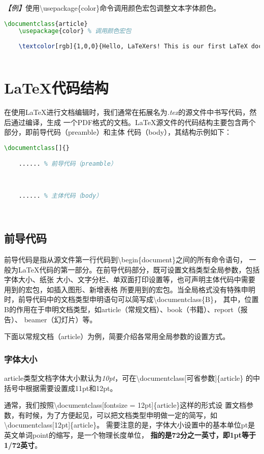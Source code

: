 \emph{【例】}使用\textbackslash usepackage\{color\}命令调用颜色宏包调整文本字体颜色。
\begin{lstlisting}[language=TeX]
    \documentclass{article}
    \usepackage{color} % 调用颜色宏包
    
    \textcolor[rgb]{1,0,0}{Hello, LaTeXers! This is our first LaTeX document.}
    
\end{lstlisting}

\section{\LaTeX 代码结构}
在使用LaTeX进行文档编辑时，我们通常在拓展名为\emph{.tex}的源文件中书写代码，然后通过编译，生成
一个PDF格式的文档。LaTeX源文件的代码结构主要包含两个部分，即前导代码（preamble）和主体
代码（body），其结构示例如下：
\begin{lstlisting}[language=TeX]
    \documentclass[]{}

    ...... % 前导代码（preamble）

    

    ...... % 主体代码（body）

    
\end{lstlisting}

\subsection{前导代码}
前导代码是指从源文件第一行代码到\textbackslash begin\{document\}之间的所有命令语句，
一般为LaTeX代码的第一部分。在前导代码部分，既可设置文档类型全局参数，包括字体大小、纸张
大小、文字分栏、单双面打印设置等，也可声明主体代码中需要用到的宏包，如插入图形、新增表格
所要用到的宏包。当全局格式没有特殊申明时，前导代码中的文档类型申明语句可以简写成\textbackslash documentclass\{B\}，
其中，位置B的作用在于申明文档类型，如article（常规文档）、book（书籍）、report（报告）、
beamer（幻灯片）等。

下面以常规文档（article）为例，简要介绍各常用全局参数的设置方式。

\subsubsection{字体大小}
article类型文档字体大小默认为\emph{10pt}，可在\textbackslash documentclass[可省参数]\{article\}
的中括号中根据需要设置成11pt和12pt。

通常，我们按照\textbackslash documentclass[fontsize = 12pt]\{article\}这样的形式设
置文档参数，有时候，为了方便起见，可以把文档类型申明做一定的简写，如\textbackslash documentclass[12pt]\{article\}。
需要注意的是，字体大小设置中的基本单位pt是英文单词point的缩写，是一个物理长度单位，
\textbf{指的是72分之一英寸，即1pt等于1/72英寸}。

